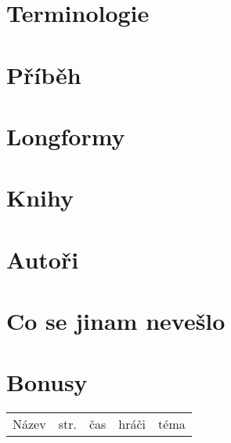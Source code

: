 \documentclass[a4paper,10pt,openany]{book}
\begin{document}
\chapter{Terminologie}\label{terminologie}
\label{:kategorie:terminologie}


\chapter{Příběh}




\chapter{Longformy}\label{longformy}




\chapter{Knihy}\label{knihy}



\chapter{Autoři}\label{autori}


\chapter{Co se jinam nevešlo}\label{co se jinam nevešlo}


\chapter{Bonusy}
\pagebreak
\newcommand{\btbinfo}[6]{

\ifx Z#6 \textbf{#1} \else #1 \small{  (i)} \fi   & \pageref{#2} &  \small{#3} & \small{#4} & \small{#5}\hline
}
\begin{longtable}{|p{4cm}|p{.4cm}|p{3.2cm}|p{3cm}|p{4.2cm}|}
\hline 
Název&str.&čas&hráči&téma \hline 


\end{longtable}
\pagebreak
\renewcommand{\btbinfo}[6]{
\ifx Z#6 \large{#1}   \fi

} 
\end{document}
